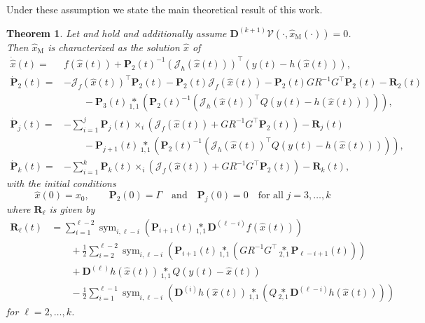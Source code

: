 \documentclass[11pt,reqno]{amsart}
\numberwithin{equation}{section}
\theoremstyle{plain}
\newtheorem{theorem}{Theorem}[section]
\newcommand{\J}{\mathcal{J}}
\DeclareMathOperator{\Sym}{sym}
\newcommand{\tenp}[2]{\underset{#1,#2}{*}}
\newcommand{\TenDeriv}[1]{\mathbf{D}^{(#1)}}
\begin{document}
Under these assumption we state the main theoretical result of this work.
%
\begin{theorem}\label{thm:main}
    Let  and  hold and additionally assume $\TenDeriv{k+1} \mathcal{V}(\cdot,\widehat{x}_\mathrm{M}(\cdot)) = 0$.
    Then $\widehat{x}_\mathrm{M}$ is characterized as the solution $\widehat{x}$ of 
    \begin{equation}\label{EQ:HigherOrderObserver}
    \begin{aligned}
        \dot{\widehat{x}}(t) 
        =& f(\widehat{x}(t)) + \mathbf{P}_2(t)^{-1} (\mathcal{J}_h(\widehat{x}(t)))^\top  (y(t) - h(\widehat{x}(t))), 
        \\
        \dot{\mathbf{P}}_2(t) 
        =& - \J_f(\widehat{x}(t))^\top  \mathbf{P}_2(t) - \mathbf{P}_2(t) \J_f(\widehat{x}(t)) - \mathbf{P}_2(t) GR^{-1}G^\top  \mathbf{P}_2(t)   - \mathbf{R}_2(t) 
        \\
        &\qquad - \mathbf{P}_3(t) \tenp{1}{1} \left(\mathbf{P}_2(t)^{-1} \left(\mathcal{J}_h(\widehat{x}(t))^\top Q\left(y(t) - h(\widehat{x}(t))\right)\right)\right), 
        \\
        \dot{\mathbf{P}}_j(t) 
        =& -\sum_{i=1}^{j} \mathbf{P}_j(t) \times_i \left(\J_f(\widehat{x}(t)) + G R^{-1} G^\top  \mathbf{P}_2(t) \right) - \mathbf{R}_j(t) 
        \\
        &\qquad - \mathbf{P}_{j+1}(t) \tenp{1}{1}\left(\mathbf{P}_2(t)^{-1} \left(\mathcal{J}_h(\widehat{x}(t))^\top Q\left(y(t) - h(\widehat{x}(t))\right)\right)\right),
        \\
        \dot{\mathbf{P}}_k(t)  
        =& -\sum_{i=1}^{k} \mathbf{P}_k(t) \times_i \left( \J_f(\widehat{x}(t)) + G R^{-1}G^\top  \mathbf{P}_2(t) \right) - \mathbf{R}_k(t),
    \end{aligned}
    \end{equation}
with the initial conditions
\[
\widehat{x}(0) = x_0, \qquad \mathbf{P}_2(0) = \Gamma
\quad \text{and} \quad \mathbf{P}_j(0) = 0 \quad\text{for all } j = 3,\dots,k
\]
where 
$\mathbf{R}_\ell$ is given by
\begin{equation}\label{eq:HOEKF_R}
    \begin{aligned}
        \mathbf{R}_\ell(t) &=
        \sum_{i=1}^{\ell-2} \Sym_{i,\ell-i}\left( \mathbf{P}_{i+1}(t)  \tenp{1}{1}\TenDeriv{\ell-i}f(\widehat{x}(t)) \right)
        \\
        &\qquad + \frac{1}{2}\sum_{i=2}^{\ell-2} \Sym_{i,\ell-i}\left( \mathbf{P}_{i+1} (t) \tenp{1}{1} \left( G R^{-1} G^\top \tenp{2}{1}\mathbf{P}_{\ell-i+1} (t) \right) \right)
        \\
        &\qquad + \TenDeriv{\ell} h(\widehat{x}(t)) \tenp{1}{1} Q  (y(t) - \widehat{x}(t))
        \\
        & \qquad - \frac{1}{2} \sum_{i=1}^{\ell -1} \Sym_{i,\ell-i} \left(\TenDeriv{i} h(\widehat{x}(t)) \tenp{1}{1} \left( Q \tenp{2}{1} \TenDeriv{\ell-i} h(\widehat{x}(t))\right) \right)
    \end{aligned}
\end{equation}
for $\ell= 2,\dots,k$.
\end{theorem}
\end{document}
